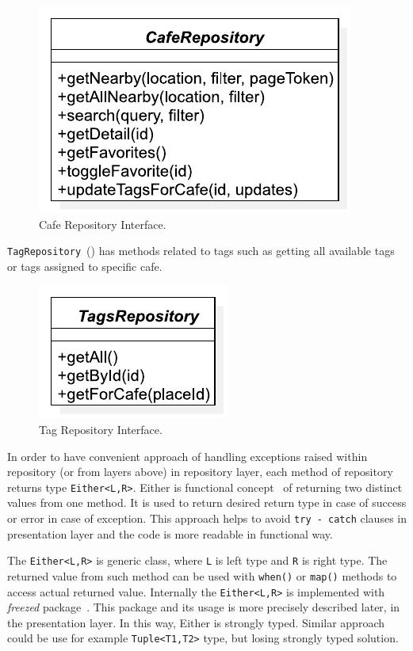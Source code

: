 \begin{figure}[ht]
    \centering
    \includegraphics[width=0.5\linewidth]{img/implementation/cafe_repository_interface.pdf}
    \caption{Cafe Repository Interface.}
    \label{fig:ct-cafe-repo-interface}
\end{figure}

\verb|TagRepository|~() has methods related to tags such as getting all available tags or tags assigned to specific cafe. 

\begin{figure}[ht]
    \centering
    \includegraphics[width=0.33\linewidth]{img/implementation/tag_repository_interface.pdf}
    \caption{Tag Repository Interface.}
    \label{fig:ct-tag-repo-interface}
\end{figure}

In order to have convenient approach of handling exceptions raised within repository (or from layers above) in repository layer, each method of repository returns type \verb|Either<L,R>|. Either is functional concept~\cite{ibm-either} of returning two distinct values from one method. It is used to return desired return type in case of success or error in case of exception. This approach helps to avoid \verb|try - catch| clauses in presentation layer and the code is more readable in functional way. 

The \verb|Either<L,R>| is generic class, where \verb|L| is left type and \verb|R| is right type. The returned value from such method can be used with \verb|when()| or \verb|map()| methods to access actual returned value. Internally the \verb|Either<L,R>| is implemented with \textit{freezed} package~\cite{package-freezed}. This package and its usage is more precisely described later, in the presentation layer. In this way, Either is strongly typed. Similar approach could be use for example \verb|Tuple<T1,T2>| type, but losing strongly typed solution. 

